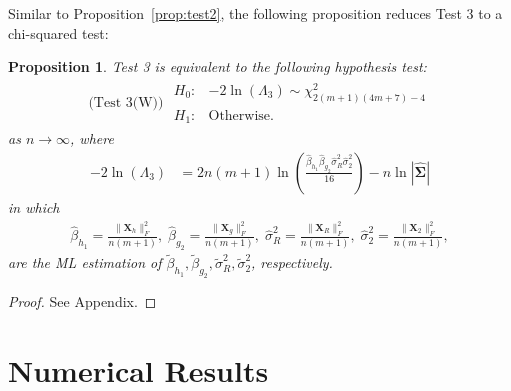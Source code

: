 \documentclass[journal,draftcls,onecolumn,12pt,twoside]{IEEEtran}
\newtheorem{proposition}{Proposition}
\begin{document}
Similar to Proposition~\ref{prop:test2}, the following proposition reduces Test
3 to a chi-squared test:
\begin{proposition}
  \label{prop:test3}
  Test 3 is equivalent to the following hypothesis test:
  \begin{align}
    \mbox{(Test 3(W)) } \begin{array}{ll}H_0: & -2\ln(\Lambda_3) \sim
    \chi_{2(m+1)(4m+7)-4}^2 \\ H_1: & \mbox{Otherwise.}
    \end{array}
  \end{align}
  as $n\rightarrow\infty$, where
  \begin{align}
    -2\ln(\Lambda_3) & =
    2n(m+1)\ln\left(\frac{\hat{\beta}_{h_1}\hat{\beta}_{g_2}
    \hat{\sigma}_R^2\hat{\sigma}_2^2}{16}\right) -
    n\ln|\hat{\mathbf{\Sigma}}|
  \end{align}
  in which
  \begin{align}
    \hat{\beta}_{h_1} = \frac{\|\mathbf{X}_h\|_F^2}{n(m +
    1)},\;
    \hat{\beta}_{g_2} = \frac{\|\mathbf{X}_g\|_F^2}{n(m +
    1)},\;
    \hat{\sigma}^2_{R} = \frac{\|\mathbf{X}_R\|_F^2}{n(m +
    1)},\;
    \hat{\sigma}^2_{2} = \frac{\|\mathbf{X}_2\|_F^2}{n(m +
    1)},\label{eq:beta_sigma_ml}
  \end{align}
  are the ML estimation of $\tilde{\beta}_{h_1}, \tilde{\beta}_{g_2},
  \tilde{\sigma}^2_{R}, \tilde{\sigma}^2_{2}$, respectively.
\end{proposition}
\begin{proof}
  See Appendix.
\end{proof}

\section{Numerical Results}
\label{sec:numerical}
\end{document}
